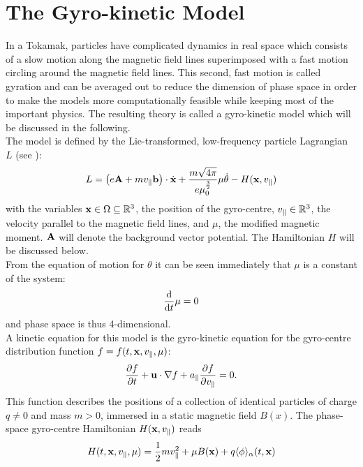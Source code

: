 

\label{sec:introduction}
\section{The Gyro-kinetic Model}

In a Tokamak, particles have complicated dynamics in real space which consists of a slow motion along the magnetic field lines superimposed with a fast motion circling around the magnetic field lines. This second, fast motion is called gyration and can be averaged out to reduce the dimension of phase space in order to make the models more computationally feasible while keeping most of the important physics. The resulting theory is called a gyro-kinetic model which will be discussed in the following.\\
The model is defined by the Lie-transformed, low-frequency particle Lagrangian $L$ (see \cite{Bottino_Sonnendrucker_2015}):
\begin{equation}\label{Lagrangian}
	L = \left(e\mathbf{A} + m v_\parallel \mathbf{b} \right)\cdot\dot{\mathbf{x}} + \frac{m\sqrt{4\pi}}{e \mu_0^{\frac{3}{2}}} \mu \dot{\theta} - H(\mathbf{x}, v_\parallel)
\end{equation}
with the variables $\mathbf{x} \in \Omega \subseteq \mathbb{R}^3$, the position of the gyro-centre, $v_\parallel \in \mathbb{R}^3$, the velocity parallel to the magnetic field lines, and $\mu$, the modified magnetic moment. $\mathbf{A}$ will denote the background vector potential. The Hamiltonian $H$ will be discussed below.\\
From the equation of motion for $\theta$ it can be seen immediately that $\mu$ is a constant of the system:
\begin{equation}
	\frac{\text{d} }{\text{d} t} \mu = 0
\end{equation}
and phase space is thus 4-dimensional.\\
A kinetic equation for this model is the gyro-kinetic equation for the gyro-centre distribution function $f=f(t,\mathbf{x}, v_\parallel, \mu)$:
\begin{equation}\label{drift-kinetic model}
	\frac{\partial f}{\partial t} + \mathbf{u} \cdot \nabla f + a_\parallel \frac{\partial f}{\partial v_\parallel} = 0.
\end{equation}
This function describes the positions of a collection of identical particles of charge $q\neq0$ and mass $m>0$, immersed in a static magnetic field $B(x)$.
The phase-space gyro-centre Hamiltonian $H(\mathbf{x}, v_\parallel)$ reads
\begin{equation}
	H(t, \mathbf{x}, v_\parallel, \mu) = \frac{1}{2} m v_\parallel^2 + \mu B(\mathbf{x}) + q \langle \phi \rangle_\alpha (t,\mathbf{x})
\end{equation}
